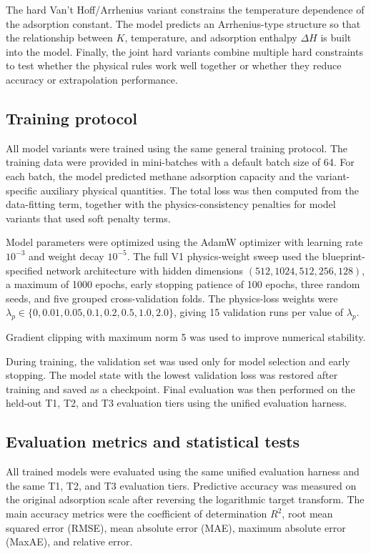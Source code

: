 \documentclass[11pt]{article}
\begin{document}
The hard Van't Hoff/Arrhenius variant constrains the temperature dependence of
the adsorption constant. The model predicts an Arrhenius-type structure so that
the relationship between \(K\), temperature, and adsorption enthalpy \(\Delta H\) is built
into the model. Finally, the joint hard variants combine multiple hard constraints to test
whether the physical rules work well together or whether they reduce accuracy
or extrapolation performance.

\subsection{Training protocol}

All model variants were trained using the same general training protocol. The
training data were provided in mini-batches with a default batch size of 64.
For each batch, the model predicted methane adsorption capacity and the variant-specific
auxiliary physical quantities. The total loss was then computed from the
data-fitting term, together with the physics-consistency penalties for
model variants that used soft penalty terms.

Model parameters were optimized using the AdamW optimizer with learning rate
\(10^{-3}\) and weight decay \(10^{-5}\). The full V1 physics-weight sweep used
the blueprint-specified network architecture with hidden dimensions
\((512,1024,512,256,128)\), a maximum of 1000 epochs, early stopping patience of
100 epochs, three random seeds, and five grouped cross-validation folds. The
physics-loss weights were
\(\lambda_p\in\{0,0.01,0.05,0.1,0.2,0.5,1.0,2.0\}\), giving 15 validation runs
per value of \(\lambda_p\).

Gradient clipping with maximum norm 5 was used to improve numerical stability.

During training, the validation set was used only for model selection and early
stopping. The model state with the lowest validation loss was restored after
training and saved as a checkpoint. Final evaluation was then performed on the
held-out T1, T2, and T3 evaluation tiers using the unified evaluation harness.



\subsection{Evaluation metrics and statistical tests}

All trained models were evaluated using the same unified evaluation harness and
the same T1, T2, and T3 evaluation tiers. Predictive accuracy was measured on
the original adsorption scale after reversing the logarithmic target transform.
The main accuracy metrics were the coefficient of determination \(R^2\), root
mean squared error (RMSE), mean absolute error (MAE), maximum absolute error
(MaxAE), and relative error.
\end{document}
